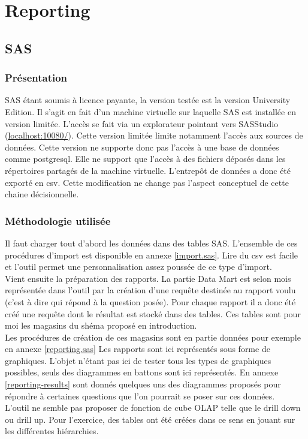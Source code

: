 
\chapter{Reporting}
\section{SAS}
\subsection{Présentation}
SAS étant soumis à licence payante, la version testée est la version University Edition. Il s'agit en fait d'un machine virtuelle sur laquelle SAS est installée en version limitée. L'accès se fait via un explorateur pointant vers SASStudio (\url{localhost:10080/}). Cette version limitée limite notamment l'accès aux sources de données. Cette version ne supporte donc pas l'accès à une base de données comme postgresql. Elle ne support que l'accès à des fichiers déposés dans les répertoires partagés de la machine virtuelle. L'entrepôt de données a donc été exporté en csv. Cette modification ne change pas l'aspect conceptuel de cette chaine décisionnelle.
\subsection{Méthodologie utilisée}
Il faut charger tout d'abord les données dans des tables SAS. L'ensemble de ces procédures d'import est disponible en annexe \ref{import.sas}. Lire du csv est facile et l'outil permet une personnalisation assez poussée de ce type d'import.\\
Vient ensuite la préparation des rapports. La partie Data Mart est selon mois représentée dans l'outil par la création d'une requête destinée au rapport voulu (c'est à dire qui répond à la question posée). Pour chaque rapport il a donc été créé une requête dont le résultat est stocké dans des tables. Ces tables sont pour moi les magasins du shéma proposé en introduction.\\ 
Les procédures de création de ces magasins sont en partie données pour exemple en annexe \ref{reporting.sas}
Les rapports sont ici représentés sous forme de graphiques. L'objet n'étant pas ici de tester tous les types de graphiques possibles, seuls des diagrammes en battons sont ici représentés. En annexe \ref{reporting-results} sont donnés quelques uns des diagrammes proposés pour répondre à certaines questions que l'on pourrait se poser sur ces données.\\
L'outil ne semble pas proposer de fonction de cube OLAP telle que le drill down ou drill up. Pour l'exercice, des tables ont été créées dans ce sens en jouant sur les différentes hiérarchies.

